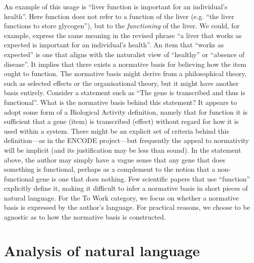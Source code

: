 \documentclass{article}
\begin{document}
An example of this usage is ``liver function is important for an individual's health''.
Here function does not refer to a function of the liver (e.g. ``the liver functions to store glycogen''), but to the \emph{functioning} of the liver.
We could, for example, express the same meaning in the revised phrase ``a liver that works as expected is important for an individual's health''.
An item that ``works as expected'' is one that aligns with the naturalist view of ``healthy'' or ``absence of disease''.
It implies that there exists a normative basis for believing how the item ought to function.
The normative basis might derive from a philosophical theory, such as selected effects or the organisational theory, but it might have another basis entirely.
Consider a statement such as ``The gene is transcribed and thus is functional''.
What is the normative basis behind this statement?
It appears to adopt some form of a Biological Activity definition, namely that for function it is sufficient that a gene (item) is transcribed (effect) without regard for how it is used within a system.
There might be an explicit set of criteria behind this definition---as in the ENCODE project---but frequently the appeal to normativity will be implicit (and its justification may be less than sound).
In the statement above, the author may simply have a vague sense that any gene that does something is functional, perhaps as a complement to the notion that a non-functional gene is one that does nothing.
Few scientific papers that use ``function'' explicitly define it, making it difficult to infer a normative basis in short pieces of natural language.
For the To Work category, we focus on whether a normative basis is expressed by the author's language.
For practical reasons, we choose to be agnostic as to how the normative basis is constructed.

\section{Analysis of natural language}
\label{sec:analys-natur-lang}
\end{document}
